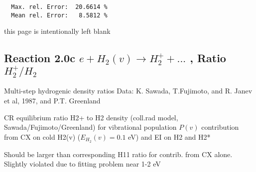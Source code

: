\documentclass[12pt,dvipdfmx]{article}
\begin{document}
\begin{small}
\begin{verbatim}
  Max. rel. Error:  20.6614 %
  Mean rel. Error:   8.5812 %

\end{verbatim}\end{small}
\newpage
this page is intentionally left blank
\texttt{}
\newpage

\subsection{
Reaction 2.0c   $e +  H_2(v) \rightarrow H_2^+ + ... $ , Ratio \ $H_2^+/H_2$
}
 Multi-step hydrogenic density ratios
 Data: K. Sawada, T.Fujimoto, \cite{kn:Sawada} and R. Janev et al, 1987, and P.T. Greenland


  CR equilibrium ratio H2+ to H2 density
  (coll.rad model, Sawada/Fujimoto/Greenland) for vibrational population $P(v)$
  contribution from CX on cold H2(v) ($E_{H_2}(v)=0.1$ eV) and EI on H2 and H2*


Should be larger than corresponding H11 ratio for contrib. from CX alone.
Slightly violated due to fitting problem near 1-2 eV
\end{document}
